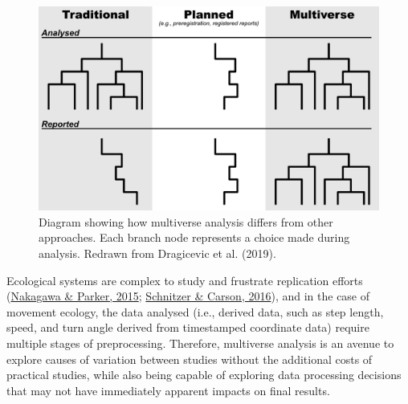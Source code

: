 \documentclass[10pt,a4paper]{article}
\begin{document}
\begin{figure}
\includegraphics[width=1\linewidth]{../ext_images/Multiverse compared diagram} \caption{Diagram showing how multiverse analysis differs from other approaches. Each branch node represents a choice made during analysis. Redrawn from Dragicevic et al. (2019).}\label{fig:multiDiagram}
\end{figure}

Ecological systems are complex to study and frustrate replication efforts (\protect\hyperlink{ref-nakagawa_replicating_2015}{Nakagawa \& Parker, 2015}; \protect\hyperlink{ref-schnitzer_would_2016}{Schnitzer \& Carson, 2016}), and in the case of movement ecology, the data analysed (i.e., derived data, such as step length, speed, and turn angle derived from timestamped coordinate data) require multiple stages of preprocessing.
Therefore, multiverse analysis is an avenue to explore causes of variation between studies without the additional costs of practical studies, while also being capable of exploring data processing decisions that may not have immediately apparent impacts on final results.
\end{document}
